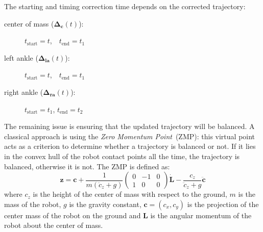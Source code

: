 The starting and timing correction time depends on the corrected trajectory:
\begin{description}
\item[center of mass ($\mathbf{\Delta_c}(t)$):]\hspace{3cm}
  $t_{\text{start}} = t$,~~$t_{\text{end}} = t_1$
\item[left ankle ($\mathbf{\Delta_{\text{la}}}(t)$):]\hspace{3cm}
  $t_{\text{start}} = t$,~~$t_{\text{end}} = t_1$
\item[right ankle ($\mathbf{\Delta_{\text{ra}}}(t)$):]\hspace{3cm}
  $t_{\text{start}} = t_1$, $t_{\text{end}} = t_2$
\end{description}

The remaining issue is ensuring that the updated trajectory will be balanced. A classical approach is using the \textit{Zero Momentum Point}~(ZMP): this virtual point acts as a criterion to determine whether a trajectory is balanced or not. If it lies in the convex hull of the robot contact points all the time, the trajectory is balanced, otherwise it is not. The ZMP is defined as:
%
\begin{equation} \label{eq:zmp1}
  \mathbf{z} = \mathbf{c} + \frac{1}{m(\ddot{c}_z +
    g)}\left(\begin{array}{ccc} 0 &-1 &0\\1 &0 &0\end{array}\right)
    \mathbf{\dot{\textbf{L}}} - \frac{c_z}{\ddot{c}_z + g}
    \ddot{\mathbf{c}}
\end{equation}
%
where $c_z$ is the height of the center of mass with respect to the ground, $m$ is the mass of the robot, $g$ is the gravity constant, \mbox{$\mathbf{c}=(c_x,c_y)$} is the projection of the center mass of
the robot on the ground and $\textbf{L}$ is the angular momentum of the robot about the center of mass.

